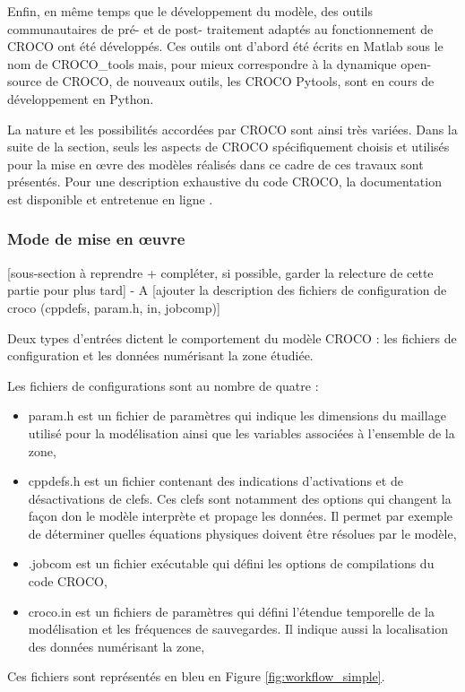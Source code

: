 \documentclass[10pt,a4paper,titlepage]{article}
\begin{document}
Enfin, en même temps que le développement du modèle, des outils communautaires de pré- et de post- traitement adaptés au fonctionnement de CROCO ont été développés.
Ces outils ont d'abord été écrits en Matlab sous le nom de CROCO\_tools mais, pour mieux correspondre à la dynamique open-source de CROCO, de nouveaux outils, les CROCO Pytools, sont en cours de développement en Python.

La nature et les possibilités accordées par CROCO sont ainsi très variées.
Dans la suite de la section, seuls les aspects de CROCO spécifiquement choisis et utilisés pour la mise en \oe{}vre des modèles réalisés dans ce cadre de ces travaux sont présentés.
Pour une description exhaustive du code CROCO, la documentation est disponible et entretenue en ligne \cite{documentation_croco}.

\subsubsection{Mode de mise en \oe{}uvre}
\label{subsub:presentation_generale}
[sous-section à reprendre + compléter, si possible, garder la relecture de cette partie pour plus tard] - A
[ajouter la description des fichiers de configuration de croco (cppdefs, param.h, in, jobcomp)]

Deux types d'entrées dictent le comportement du modèle CROCO : les fichiers de configuration et les données numérisant la zone étudiée.

Les fichiers de configurations sont au nombre de quatre :
\begin{itemize}
    \item param.h est un fichier de paramètres qui indique les dimensions du maillage utilisé pour la modélisation ainsi que les variables associées à l'ensemble de la zone,
    \item cppdefs.h est un fichier contenant des indications d'activations et de désactivations de clefs. Ces clefs sont notamment des options qui changent la façon don le modèle interprète et propage les données. Il permet par exemple de déterminer quelles équations physiques doivent être résolues par le modèle,
    \item .jobcom est un fichier exécutable qui défini les options de compilations du code CROCO,
    \item croco.in est un fichiers de paramètres qui défini l'étendue temporelle de la modélisation et les fréquences de sauvegardes. Il indique aussi la localisation des données numérisant la zone,
\end{itemize}
Ces fichiers sont représentés en bleu en Figure \ref{fig:workflow_simple}.
\end{document}
